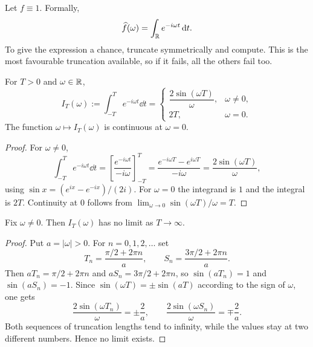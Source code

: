 Let $f\equiv1$. Formally,
\begin{equation}
\widehat{f}(\omega)=\int_{\mathbb{R}}e^{-i\omega t}\,\mathrm{d} t .
\label{eq:badintegral}
\end{equation}
To give the expression a chance, truncate symmetrically and compute. This is the most favourable
truncation available, so if it fails, all the others fail too.

\begin{lemma}\label{lem:IT}
For $T>0$ and $\omega\in\mathbb{R}$,
\begin{equation}
I_{T}(\omega):=\int_{-T}^{T}e^{-i\omega t}\dd t=
\begin{cases}
\dfrac{2\sin(\omega T)}{\omega}, & \omega\neq0,\\[8pt]
2T, & \omega=0 .
\end{cases}
\label{eq:IT}
\end{equation}
The function $\omega\mapsto I_{T}(\omega)$ is continuous at $\omega=0$.
\end{lemma}

\begin{proof}
For $\omega\neq0$,
\begin{equation}
\int_{-T}^{T}e^{-i\omega t}\dd t
=\left[\frac{e^{-i\omega t}}{-i\omega}\right]_{-T}^{T}
=\frac{e^{-i\omega T}-e^{i\omega T}}{-i\omega}
=\frac{2\sin(\omega T)}{\omega},
\end{equation}
using $\sin x=(e^{ix}-e^{-ix})/(2i)$. For $\omega=0$ the integrand is $1$ and the integral is
$2T$. Continuity at $0$ follows from $\lim_{\omega\to0}\sin(\omega T)/\omega=T$.
\end{proof}

\begin{proposition}\label{prop:nolimit}
Fix $\omega\neq0$. Then $I_{T}(\omega)$ has no limit as $T\to\infty$.
\end{proposition}

\begin{proof}
Put $a=|\omega|>0$. For $n=0,1,2,\dots$ set
\begin{equation}
T_{n}=\frac{\pi/2+2\pi n}{a},
\qquad
S_{n}=\frac{3\pi/2+2\pi n}{a}.
\end{equation}
Then $aT_{n}=\pi/2+2\pi n$ and $aS_{n}=3\pi/2+2\pi n$, so $\sin(aT_{n})=1$ and $\sin(aS_{n})=-1$.
Since $\sin(\omega T)=\pm\sin(aT)$ according to the sign of $\omega$, one gets
\begin{equation}
\frac{2\sin(\omega T_{n})}{\omega}=\pm\frac{2}{a},
\qquad
\frac{2\sin(\omega S_{n})}{\omega}=\mp\frac{2}{a}.
\end{equation}
Both sequences of truncation lengths tend to infinity, while the values stay at two different
numbers. Hence no limit exists.
\end{proof}

